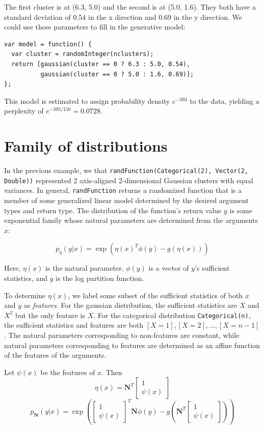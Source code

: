 \documentclass{article}
\begin{document}
  The first cluster is at (6.3, 5.0) and the second is at (5.0, 1.6).  They both
  have a standard deviation of 0.54 in the x direction and 0.69 in the y direction.
  We could use these parameters to fill in the generative model:
  \begin{lstlisting}
var model = function() {
  var cluster = randomInteger(nclusters);
  return [gaussian(cluster == 0 ? 6.3 : 5.0, 0.54),
          gaussian(cluster == 0 ? 5.0 : 1.6, 0.69)];
};
  \end{lstlisting}
  This model is estimated to assign probability density $e^{-393}$ to the data, yielding a perplexity of $e^{-393/150} = 0.0728$.

  \section{Family of distributions}
  
    
  In the previous example, we that \texttt{randFunction(Categorical(2), Vector(2, Double))} represented 2 axis-aligned 2-dimensional Gaussian clusters with equal variances.  In general, \texttt{randFunction} returns a randomized function that is a member of some generalized linear model
    determined by the desired argument types and return type.
    The distribution
    of the function's return value $y$
    is some exponential family whose natural
    parameters are determined from the arguments $x$:

    $$p_{\eta}(y | x) = \exp\left(\eta(x)^T \phi(y) - g(\eta(x))\right)$$

    Here, $\eta(x)$ is the natural parameter, $\phi(y)$ is a vector of $y$'s sufficient statistics,
    and $g$ is the log partition function.

    To determine $\eta(x)$, we label
    some subset of the sufficient statistics of both $x$ and $y$ as \emph{features}.  For the gaussian
    distribution, the sufficient statistics are $X$ and $X^2$ but the only feature is $X$.  For the
    categorical distribution \texttt{Categorical(n)}, the sufficient statistics
    and features are both $[X = 1], [X = 2], ..., [X=n - 1]$.
    The natural
    parameters corresponding to non-features are constant, while natural
    parameters corresponding to features are determined as an affine
    function of the features of the arguments.

    Let $\psi(x)$ be the features of $x$.  Then
  $$\eta(x) = \mathbf{N}^T \begin{bmatrix} 1 \\ \psi(x) \end{bmatrix}$$
    $$p_{\mathbf{N}}(y | x) = \exp\left(\begin{bmatrix} 1 \\ \psi(x) \end{bmatrix} ^T \mathbf{N} \phi(y) - g\left(\mathbf{N}^T \begin{bmatrix} 1 \\ \psi(x) \end{bmatrix}\right)\right)$$
\end{document}
